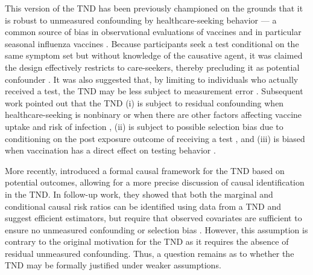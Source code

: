 \documentclass[11pt]{article}
\begin{document}
This version of the TND has been previously championed on the grounds that it is robust to unmeasured confounding by healthcare-seeking behavior  --- a common source of bias in observational evaluations of vaccines and in particular seasonal influenza vaccines \cite{jackson_test-negative_2013}. Because participants seek a test conditional on the same symptom set but without knowledge of the causative agent, it was claimed the design effectively restricts to care-seekers, thereby precluding it as potential confounder \cite{jackson_test-negative_2013}. It was also suggested that, by limiting to individuals who actually received a test, the TND may be less subject to measurement error \cite{jackson_test-negative_2013}. Subsequent work pointed out that the TND (i) is subject to residual confounding when healthcare-seeking is nonbinary or when there are other factors affecting vaccine uptake and risk of infection \cite{sullivan_theoretical_2016,lewnard_theoretical_2021,lipsitch_observational_2016}, (ii) is subject to possible selection bias due to conditioning on the post exposure outcome of receiving a test \cite{sullivan_theoretical_2016,lipsitch_observational_2016}, and (iii) is biased when vaccination has a direct effect on testing behavior \cite{foppa_case_2013}. 

More recently, \textcite{schnitzer_estimands_2022} introduced a formal causal framework for the TND based on potential outcomes, allowing for a more precise discussion of causal identification in the TND. In follow-up work, they showed that both the marginal and conditional causal risk ratios can be identified using data from a TND and suggest efficient estimators, but require that observed covariates are sufficient to ensure no unmeasured confounding or selection bias \cite{jiang_tnddr_2023}. However, this assumption is contrary to the original motivation for the TND as it requires the absence of residual unmeasured confounding. Thus, a question remains as to whether the TND may be formally justified under weaker assumptions.
\end{document}
